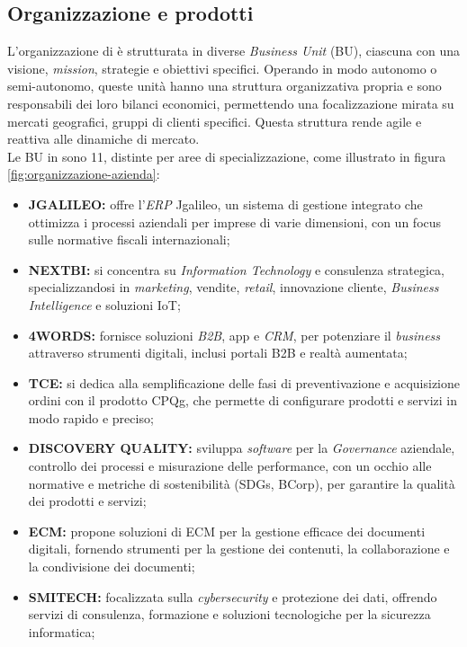 \subsection{Organizzazione e prodotti}
L'organizzazione di \azienda{} è strutturata in diverse \textit{Business Unit} (BU), ciascuna con una visione, \textit{mission}, strategie e obiettivi specifici. Operando in modo autonomo o semi-autonomo, 
queste unità hanno una struttura organizzativa propria e sono responsabili dei loro bilanci economici, permettendo una focalizzazione mirata su mercati geografici, gruppi di clienti specifici. 
Questa struttura rende \azienda{} agile e reattiva alle dinamiche di mercato. \\
Le BU in \azienda{} sono 11, distinte per aree di specializzazione, come illustrato in figura \ref{fig:organizzazione-azienda}:
\begin{itemize}
\item \textbf{JGALILEO:} offre l’\textit{\gls{ERP}} Jgalileo, un sistema di gestione integrato che ottimizza i processi aziendali per imprese di varie dimensioni, con un focus sulle normative fiscali internazionali;
\item \textbf{NEXTBI:} si concentra su \textit{Information Technology} e consulenza strategica, specializzandosi in \textit{marketing}, vendite, \textit{retail}, innovazione cliente, \textit{Business Intelligence} e soluzioni \gls{IoT};
\item \textbf{4WORDS:} fornisce soluzioni \textit{\gls{B2B}}, app e \textit{\gls{CRM}}, per potenziare il \textit{business} attraverso strumenti digitali, inclusi portali B2B e realtà aumentata;
\item \textbf{TCE:} si dedica alla semplificazione delle fasi di preventivazione e acquisizione ordini con il prodotto \gls{CPQg}, che permette di configurare prodotti e servizi in modo rapido e preciso;
\item \textbf{DISCOVERY QUALITY:} sviluppa \textit{software} per la \textit{Governance} aziendale, controllo dei processi e misurazione delle performance, con un occhio alle normative e metriche di sostenibilità (\gls{SDGs}, \gls{BCorp}), per garantire la qualità dei prodotti e servizi;
\item \textbf{ECM:} propone soluzioni di \gls{ECM} per la gestione efficace dei documenti digitali, fornendo strumenti per la gestione dei contenuti, la collaborazione e la condivisione dei documenti;
\item \textbf{SMITECH:} focalizzata sulla \textit{\gls{cybersecurity}} e protezione dei dati, offrendo servizi di consulenza, formazione e soluzioni tecnologiche per la sicurezza informatica;

\end{itemize}
